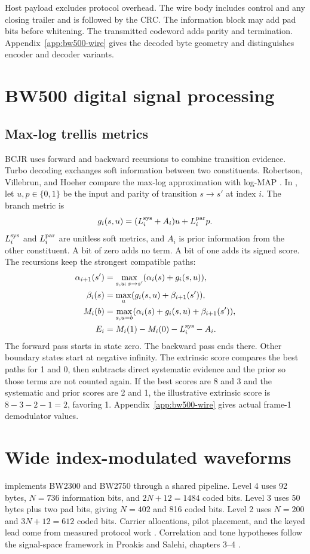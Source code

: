 \documentclass[11pt,letterpaper]{article}
\begin{document}
Host payload excludes protocol overhead. The wire body includes control
and any closing trailer and is followed by the CRC. The information block
may add pad bits before whitening. The transmitted codeword adds parity
and termination. Appendix~\ref{app:bw500-wire} gives the decoded byte
geometry and distinguishes encoder and decoder variants.

\section{BW500 digital signal processing}\label{sec:modem-dsp}


\subsection{Max-log trellis metrics}
BCJR uses forward and backward recursions to combine transition evidence.
Turbo decoding exchanges soft information between two constituents.
Robertson, Villebrun, and Hoeher compare the max-log approximation
with log-MAP \cite{bcjr,berrou,robertson}. In , let
\(u,p\in\{0,1\}\) be the input and parity of transition \(s\to s'\) at
index \(i\). The branch metric is
\[
 g_i(s,u)=(L_i^{\rm sys}+A_i)u+L_i^{\rm par}p .
\]
\(L_i^{\rm sys}\) and \(L_i^{\rm par}\) are unitless soft metrics, and
\(A_i\) is prior information from the other constituent. A bit of zero
adds no term. A bit of one adds its signed score. The recursions keep
the strongest compatible paths:
\begin{align}
 \alpha_{i+1}(s')&=\max_{s,u:\,s\to s'}(\alpha_i(s)+g_i(s,u)),\\
 \beta_i(s)&=\max_u(g_i(s,u)+\beta_{i+1}(s')),\\
 M_i(b)&=\max_{s,u=b}(\alpha_i(s)+g_i(s,u)+\beta_{i+1}(s')),\\
 E_i&=M_i(1)-M_i(0)-L_i^{\rm sys}-A_i.
\end{align}
The forward pass starts in state zero. The backward pass ends there.
Other boundary states start at negative infinity. The extrinsic score
compares the best paths for 1 and 0, then subtracts direct systematic
evidence and the prior so those terms are not counted again. If the
best scores are 8 and 3 and the systematic and prior scores are 2 and 1,
the illustrative extrinsic score is \(8-3-2-1=2\), favoring 1.
Appendix~\ref{app:bw500-wire} gives actual frame-1 demodulator values.

\section{Wide index-modulated waveforms}
 implements BW2300 and BW2750 through a shared
 pipeline. Level 4 uses 92 bytes, \(N=736\) information
bits, and \(2N+12=1484\) coded bits. Level 3 uses 50 bytes plus two pad bits,
giving \(N=402\) and 816 coded bits. Level 2 uses \(N=200\) and
\(3N+12=612\) coded bits. Carrier allocations, pilot placement, and the
keyed lead come from measured protocol work \cite{stjohn}. Correlation
and tone hypotheses follow the signal-space framework in Proakis and
Salehi, chapters 3--4 \cite{proakis}.
\end{document}
